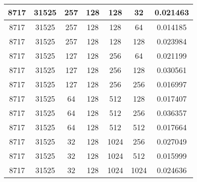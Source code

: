 \documentclass[9pt]{article}
\begin{document}
\begin{tabular}{|c|c|c|c|c|c|c| }
\hline
8717  & 31525  & 257  & 128  & 128  & 32  & 0.021463 \\
\hline
8717  & 31525  & 257  & 128  & 128  & 64  & 0.014185 \\
\hline
8717  & 31525  & 257  & 128  & 128  & 128  & 0.023984 \\
\hline
8717  & 31525  & 127  & 128  & 256  & 64  & 0.021199 \\
\hline
8717  & 31525  & 127  & 128  & 256  & 128  & 0.030561 \\
\hline
8717  & 31525  & 127  & 128  & 256  & 256  & 0.016997 \\
\hline
8717  & 31525  & 64  & 128  & 512  & 128  & 0.017407 \\
\hline
8717  & 31525  & 64  & 128  & 512  & 256  & 0.036357 \\
\hline
8717  & 31525  & 64  & 128  & 512  & 512  & 0.017664 \\
\hline
8717  & 31525  & 32  & 128  & 1024  & 256  & 0.027049 \\
\hline
8717  & 31525  & 32  & 128  & 1024  & 512  & 0.015999 \\
\hline
8717  & 31525  & 32  & 128  & 1024  & 1024  & 0.024636 \\
\hline
\end{tabular}
 
\end{document}

